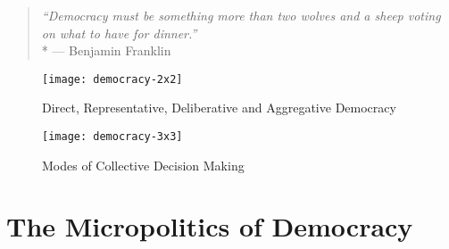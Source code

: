 
\begin{quote}
	\emph{``Democracy must be something more than two wolves and a sheep voting on what to have for dinner.''}
	\\*
	--- Benjamin Franklin
\end{quote}






\begin{figure}[htbp]
	\centering
	\texttt{[image: democracy-2x2]}
	\caption{Direct, Representative, Deliberative and Aggregative Democracy}
	\label{fig:democracy-2x2}
\end{figure}

\begin{figure}[htbp]
	\centering
	\texttt{[image: democracy-3x3]}
	\caption{Modes of Collective Decision Making}
	\label{fig:democracy-3x3}
\end{figure}

\section[Micropolitics]{The Micropolitics of Democracy}

